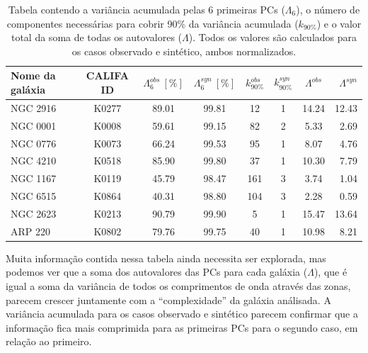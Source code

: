 \begin{table}
	\caption[Variância acumulada para as galáxias análisadas.]
	{Tabela contendo a variância acumulada pelas 6 primeiras PCs ($\Lambda_6$), o número de componentes necessárias para
	cobrir 90\% da variância acumulada ($k_{90\%}$) e o valor total da soma de todas os autovalores ($\Lambda$). Todos os
	valores são calculados para os casos observado e sintético, ambos normalizados.}
	\begin{tabular}{l c c c c c c r}
		Nome da galáxia & CALIFA ID & $\Lambda_6^{obs}\ [\%]$ & $\Lambda_6^{syn}\ [\%]$ & $k_{90\%}^{obs}$ & $k_{90\%}^{syn}$
		& $\Lambda^{obs}$ & $\Lambda^{syn}$ \\ 
		\midrule
		NGC 2916 & K0277 & 89.01 & 99.81 &  12 & 1 & 14.24 & 12.43 \\
		NGC 0001 & K0008 & 59.61 & 99.15 &  82 & 2 &  5.33 &  2.69 \\
		NGC 0776 & K0073 & 66.24 & 99.53 &  95 & 1 &  8.07 &  4.76 \\
		NGC 4210 & K0518 & 85.90 & 99.80 &  37 & 1 & 10.30 &  7.79 \\
		NGC 1167 & K0119 & 45.79 & 98.47 & 161 & 3 &  3.74 &  1.04 \\
		NGC 6515 & K0864 & 40.31 & 98.80 & 104 & 3 &  2.28 &  0.59 \\
		NGC 2623 & K0213 & 90.79 & 99.90 &   5 & 1 & 15.47 & 13.64 \\
		ARP 220  & K0802 & 79.76 & 99.75 &  40 & 1 & 10.98 &  8.21 \\
	\end{tabular}
	\label{tab:resultLambda}
\end{table}

Muita informação contida nessa tabela ainda necessita ser explorada, mas podemos ver que a soma dos autovalores das PCs
para cada galáxia ($\Lambda$), que é igual a soma da variância de todos os comprimentos de onda através das zonas,
parecem crescer juntamente com a ``complexidade'' da galáxia análisada. A variância acumulada para os casos observado e
sintético parecem confirmar que a informação fica mais comprimida para as primeiras PCs para o segundo caso, em relação
ao primeiro. 

